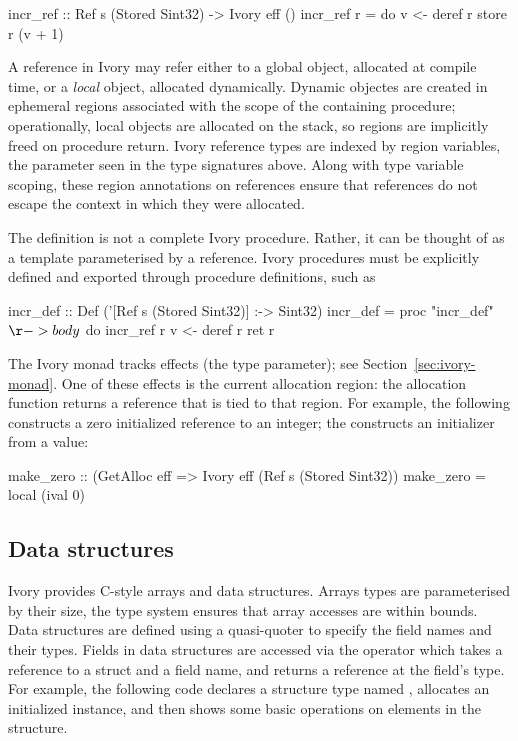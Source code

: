 \begin{code}
incr_ref :: Ref s (Stored Sint32) -> Ivory eff ()
incr_ref r = do
    v <- deref r
    store r (v + 1)
\end{code}

\noindent
A reference in Ivory may refer either to a global object, allocated at
compile time, or a \emph{local} object, allocated dynamically.
Dynamic objectes are created in ephemeral regions associated
with the scope of the containing procedure; operationally, local
objects are allocated on the stack, so regions are implicitly freed
on procedure return.  Ivory reference types are indexed by region
variables, the parameter  seen in the type signatures above.
Along with type variable scoping, these region annotations on
references ensure that references do not escape the context in which
they were allocated.

The definition  is not a complete Ivory procedure.
Rather, it can be thought of as a template parameterised by a reference.
Ivory procedures must be explicitly defined and exported through
procedure definitions, such as
\begin{code}
incr_def :: Def ('[Ref s (Stored Sint32)] :-> Sint32)
incr_def = proc "incr_def" $ \r -> body $ do
  incr_ref r
  v <- deref r
  ret r
\end{code}

The Ivory monad tracks effects (the  type parameter); see
Section~\ref{sec:ivory-monad}.  One of these effects is the current allocation
region: the allocation function  returns a reference that is tied to
that region.  For example, the following constructs a zero initialized reference
to an integer; the  constructs an initializer from a value:

\begin{code}
make_zero :: (GetAlloc eff %
          => Ivory eff (Ref s (Stored Sint32))
make_zero = local (ival 0)
\end{code}

\subsection{Data structures}

Ivory provides C-style arrays and data structures.  Arrays types are
parameterised by their size, the type system ensures that array accesses
are within bounds.  Data structures are defined using a quasi-quoter
to specify the field names and their types.  Fields in data structures
are accessed via the \cd{\mytilde>} operator which takes a
reference to a struct and a field name, and returns a reference at the
field's type. For example, the following code declares a structure
type named , allocates an initialized instance, and then
shows some basic operations on elements in the structure.

